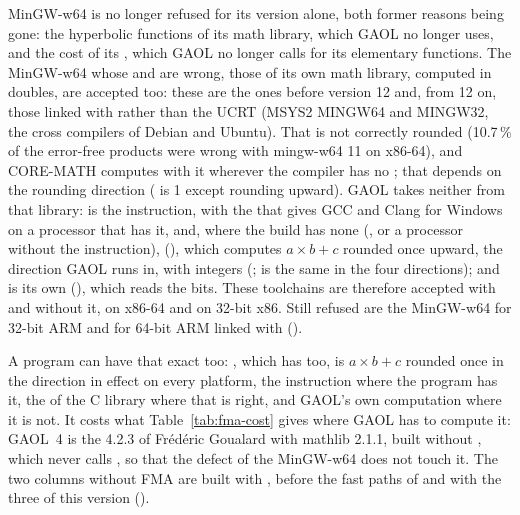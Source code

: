 \medskip
MinGW-w64 is no longer refused for its version alone, both former reasons
being gone: the hyperbolic functions of its math library, which GAOL no
longer uses, and the cost of its , which GAOL no longer
calls for its elementary functions.\newinvfive{} The MinGW-w64 whose
 and  are wrong, those of its own math library,
computed in doubles, are accepted too: these are the ones before version 12
and, from 12 on, those linked with  rather than the UCRT (MSYS2
MINGW64 and MINGW32, the cross compilers of Debian and Ubuntu). That
 is not correctly rounded (10.7\,\% of the error-free products
 were wrong with mingw-w64 11 on x86-64), and CORE-MATH
computes with it wherever the compiler has no ; that
 depends on the rounding direction
( is 1 except rounding upward). GAOL takes
neither from that library:  is the instruction, with the
 that  gives GCC and Clang for Windows on a
processor that has it, and, where the build has none (, or
a processor without the instruction), 
(), which computes $a\times b + c$ rounded once
upward, the direction GAOL runs in, with integers (;
 is the same in the four directions); and  is
its own  (), which reads the
bits. These toolchains are therefore accepted with  and without
it, on x86-64 and on 32-bit x86. Still refused are the MinGW-w64 for 32-bit ARM
and for 64-bit ARM linked with  ().

A program can have that exact  too: ,
which  has too, is $a\times b + c$ rounded once in the
direction in effect on every platform, the instruction where the program has
it, the  of the C library where that is right, and GAOL's own
computation where it is not.\newinvfive{} It costs what Table~\ref{tab:fma-cost}
gives where GAOL has to compute it: GAOL~4 is the 4.2.3 of
Fr\'ed\'eric Goualard with mathlib 2.1.1, built without , which
never calls , so that the defect of the MinGW-w64 does not touch
it. The two columns without FMA are built with
, before the fast paths of
 and with the three of this version
().

